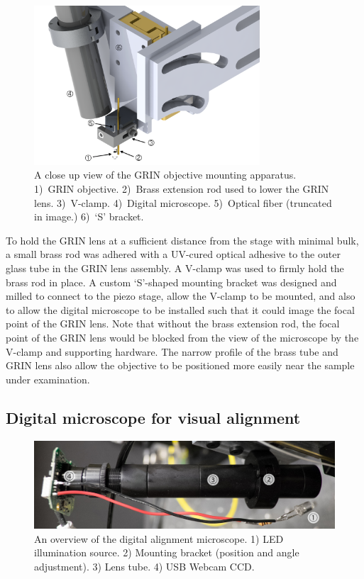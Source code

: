 \begin{figure}[h!]
\centering
\includegraphics[width=0.75\textwidth]{Images/Alignment/close_up.png}
\caption[A close up view of the GRIN objective mounting apparatus.]{A close up view of the GRIN objective mounting apparatus. 1)~GRIN objective. 2)~Brass extension rod used to lower the GRIN lens. 3)~V-clamp. 4)~Digital microscope. 5)~Optical fiber (truncated in image.) 6)~`S' bracket.}
\end{figure}

To hold the GRIN lens at a sufficient distance from the stage with minimal bulk, a small brass rod was adhered with a UV-cured optical adhesive to the outer glass tube in the GRIN lens assembly. A V-clamp was used to firmly hold the brass rod in place. A custom `S'-shaped mounting bracket was designed and milled to connect to the piezo stage, allow the V-clamp to be mounted, and also to allow the digital microscope to be installed such that it could image the focal point of the GRIN lens. Note that without the brass extension rod, the focal point of the GRIN lens would be blocked from the view of the microscope by the V-clamp and supporting hardware. The narrow profile of the brass tube and GRIN lens also allow the objective to be positioned more easily near the sample under examination.

\subsection{Digital microscope for visual alignment}


\begin{figure}[h!]
\centering
\includegraphics[width=1.0\textwidth]{Images/Photographs/DSCF1699_an.jpg}
\caption[An overview of the digital alignment microscope.]{An overview of the digital alignment microscope. 1) LED illumination source. 2) Mounting bracket (position and angle adjustment). 3) Lens tube. 4) USB Webcam CCD.}
\end{figure}

